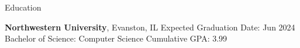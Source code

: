 \documentclass{resume} %
\begin{document}

\begin{rSection}{Education}

{\bf Northwestern University}, Evanston, IL \hfill Expected Graduation Date: Jun 2024\\
Bachelor of Science: Computer Science \hfill Cumulative GPA: 3.99

\end{rSection}

\end{document}
